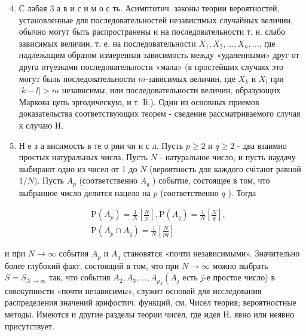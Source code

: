 \documentclass[10pt]{article}
\begin{document}
\begin{enumerate}

  \setcounter{enumi}{3}

  \item С лабая 3 а в и с и м о с ть. Асимптотич. законы теории вероятностей, установленные для последовательностей независпмых случайных величин, обычно могут быть распространены и на последовательности т. н. слабо зависимых величин, т. е. на последовательности $X_{1}, X_{2}, \ldots, X_{n}, \ldots$, где надлежащим образом измеренная зависимость между «удаленными» друг от друга отүезками последовательности «мала» (в простейших случаях это могут быль последовательности $m$-зависимых величин, где $X_{k}$ и $X_{l}$ при $|k-l|>m$ независимы, или последовательности величин, образующих Маркова цепь эргодическую, и т. Іі.). Один из основных приемов доказательства соответствующих теорем - сведение рассматриваемого случая к случаю $\mathrm{H}$.



  \item Н е з а висимость в те о рии чи и с л. Пусть $p \geqslant 2$ и $q \geqslant 2$ - два взаимно простых натуральных числа. Пусть $N$ - натуральное число, и пусть наудачу выбирают одно из чисел от 1 до $N$ (вероятность для каждого счітают равной $1 / N)$. Пусть $A_{p}$ (соответственно $A_{q}$ ) событие, состоящее в том, что выбранное число делится нацело на $p$ (соответственно $q$ ). Тогда



\end{enumerate}



\[

\begin{aligned}

& \mathrm{P}\left(A_{p}\right)=\frac{1}{N}\left[\frac{N}{p}\right], \mathrm{P}\left(A_{q}\right)=\frac{1}{N}\left[\frac{N}{q}\right], \\

& \mathrm{P}\left(A_{p} \cap A_{q}\right)=\frac{1}{N}\left[\frac{N}{p q}\right]

\end{aligned}

\]



и при $N \rightarrow \infty$ события $A_{p}$ и $A_{q}$ становятся «почти независимыми». Значительно более глубокий факт, состоящий в том, что при $N \rightarrow \infty$ можно выбрать $S=S_{N \rightarrow \infty}$ так, что события $A_{2}, A_{3}, \ldots, A_{p_{S}}\left(A_{j}\right.$ есть $j$-е простое число) в совокупности «почти независимы», служит основой для исследования распределения значений арифостич. функций, см. Чисел теория; вероятностные методы. Имеются и другие разделы теории чисел, где идея Н. явно или неявно присутствует.
\end{document}
